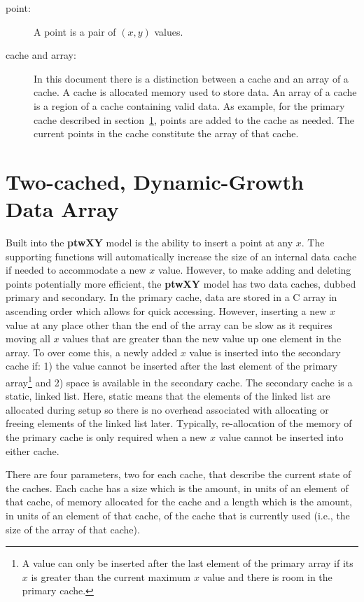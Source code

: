 \documentclass[11pt]{article}
\newcommand{\highlight}[1]{{\bf #1}}
\begin{document}
\begin{description}
    \item[point:] A point is a pair of $(x,y)$ values.
    \item[cache and array:] In this document there is a distinction between a cache and an array of a cache. A cache 
            is allocated memory used to store data. An array of a cache is a region of a cache containing valid data. As example, 
            for the primary cache described in section~\ref{TCDGArray}, points are added to the cache as needed. The current points 
            in the cache constitute the array of that cache.
\end{description}

\section{Two-cached, Dynamic-Growth Data Array} \label{TCDGArray}
Built into the \highlight{ptwXY} model is the ability to insert a point at any $x$. The supporting functions will
automatically increase the size of an internal data cache if needed to accommodate a new $x$ value. However, to make adding
and deleting points potentially more efficient, the \highlight{ptwXY} model has two data caches, dubbed primary and secondary.
In the primary cache, data are stored in a C array in ascending order which allows for quick accessing. However, inserting a new
$x$ value at any place other than the end of the array can be slow as it requires moving all $x$ values that are greater than the new value
up one element in the array.  To over come this, a newly added $x$ value
is inserted into the secondary cache if: 1) the value cannot be inserted after the last element of the primary array\footnote{A value can
only be inserted after the last element of the primary array if its $x$ is greater than the current maximum $x$ value and there is room in
the primary cache.} and 2) space is available in the secondary cache. The secondary cache is a static, linked list. Here, static means that
the elements of the linked list are allocated during setup so there is no overhead associated with allocating or freeing
elements of the linked list later. Typically, re-allocation
of the memory of the primary cache is only required when a new $x$ value cannot be inserted into either cache.

There are four parameters, two for each cache, that describe the current state of the caches. Each cache has a size which is the 
amount, in units of an element of that cache, of memory allocated for the cache and a length which is the amount, in units of an 
element of that cache, of the cache that is currently used (i.e., the size of the array of that cache).
\end{document}
